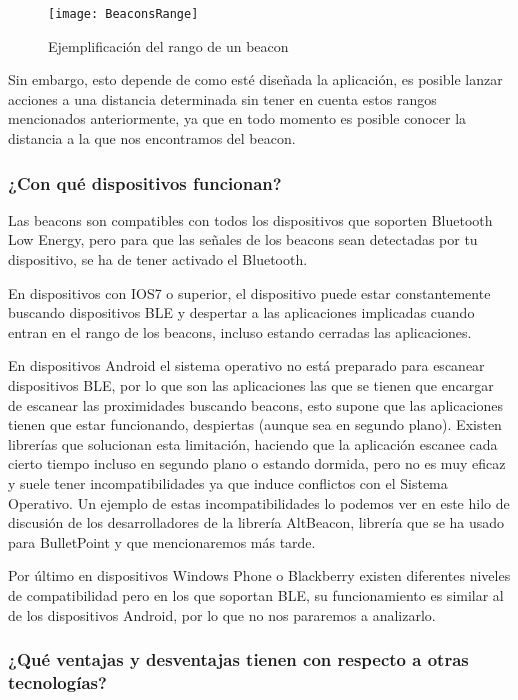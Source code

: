 \begin{figure}[h]
	\centering
	\texttt{[image: BeaconsRange]}
	\caption{Ejemplificación del rango de un beacon}
	\label{fig:beaconRange}
\end{figure}

Sin embargo, esto depende de como esté diseñada la aplicación, es posible lanzar acciones a una distancia determinada sin tener en cuenta estos rangos mencionados anteriormente, ya que en todo momento es posible conocer la distancia a la que nos encontramos del beacon.

\subsubsection{¿Con qué dispositivos funcionan?}

Las beacons son compatibles con todos los dispositivos que soporten Bluetooth Low Energy, pero para que las señales de los beacons sean detectadas por tu dispositivo, se ha de tener activado el Bluetooth. 


En dispositivos con IOS7 \cite{URL::IOS7} o superior, el dispositivo puede estar constantemente buscando dispositivos BLE y despertar a las aplicaciones implicadas cuando entran en el rango de los beacons, incluso estando cerradas las aplicaciones.


En dispositivos Android \cite{URL::Android} el sistema operativo no está preparado para escanear dispositivos BLE, por lo que son las aplicaciones las que se tienen que encargar de escanear las proximidades buscando beacons, esto supone que las aplicaciones tienen que estar funcionando, despiertas (aunque sea en segundo plano). Existen librerías que solucionan esta limitación, haciendo que la aplicación escanee cada cierto tiempo incluso en segundo plano o estando dormida, pero no es muy eficaz y suele tener incompatibilidades ya que induce conflictos con el Sistema Operativo. Un ejemplo de estas incompatibilidades lo podemos ver en este hilo de discusión \cite{URL::Incompatibilidades} de los desarrolladores de la librería AltBeacon, librería que se ha usado para BulletPoint y que mencionaremos más tarde.

Por último en dispositivos Windows Phone \cite{URL:WindowsPhone} o Blackberry \cite{URL:Blackberry} existen diferentes niveles de compatibilidad pero en los que soportan BLE, su funcionamiento es similar al de los dispositivos Android, por lo que no nos pararemos a analizarlo. 

\subsubsection{¿Qué ventajas y desventajas tienen con respecto a otras tecnologías?}

